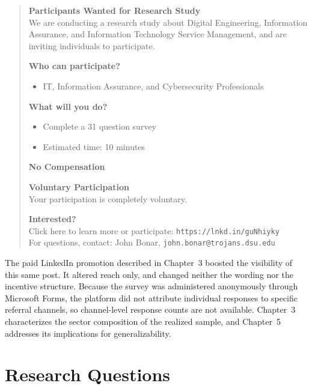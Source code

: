  \begin{quote}
    \textbf{Participants Wanted for Research Study}\\
    We are conducting a research study about Digital Engineering, Information Assurance, and Information Technology Service Management, and are inviting individuals to participate.

    \textbf{Who can participate?}
    \begin{itemize}[leftmargin=1.6em,nosep]
      \item IT, Information Assurance, and Cybersecurity Professionals
    \end{itemize}

    \textbf{What will you do?}
    \begin{itemize}[leftmargin=1.6em,nosep]
      \item Complete a 31 question survey
      \item Estimated time: 10 minutes
    \end{itemize}

    \textbf{No Compensation}

    \textbf{Voluntary Participation}\\
    Your participation is completely voluntary.

    \textbf{Interested?}\\
    Click here to learn more or participate: \texttt{https://lnkd.in/guNhiyky}\\
    For questions, contact: John Bonar, \texttt{john.bonar@trojans.dsu.edu}
  \end{quote}

  The paid LinkedIn promotion described in Chapter~3 boosted the visibility of this same post. It altered reach only, and changed neither the wording nor the incentive structure. Because the survey was administered anonymously through Microsoft Forms, the platform did not attribute individual responses to specific referral channels, so channel-level response counts are not available. Chapter~3 characterizes the sector composition of the realized sample, and Chapter~5 addresses its implications for generalizability.

  \section{Research Questions}

